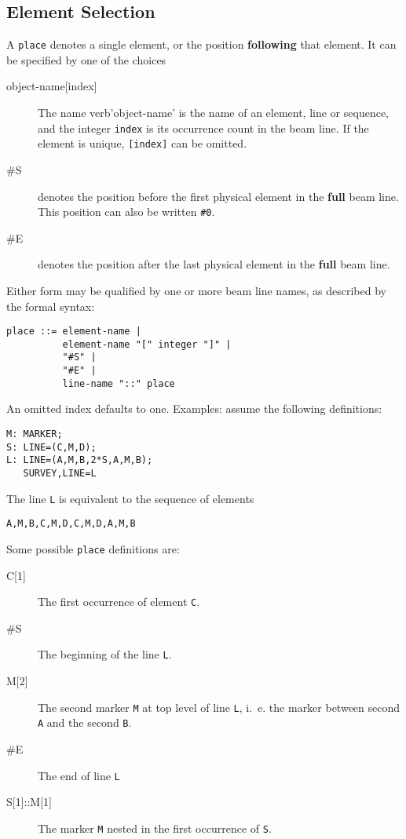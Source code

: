 \subsection{Element Selection}
\label{sec:aplace}
A \texttt{place} denotes a single element, or the position 
\textbf{following} that element.
It can be specified by one of the choices
\begin{description}
\item[{object-name[index]}]
The name verb'object-name' is the name of an element, line or sequence,
and the integer \texttt{index} is its occurrence count in the beam line.
If the element is unique, \texttt{[index]} can be omitted.
\item[{\#S}]
denotes the position before the first physical element in the \textbf{full} 
beam line.
This position can also be written \texttt{\#0}.
\item[{\#E}]
denotes the position after the last physical element in the \textbf{full} 
beam line.
\end{description}
Either form may be qualified by one or more beam line names,
as described by the formal syntax:
\begin{verbatim}
place ::= element-name |
          element-name "[" integer "]" |
          "#S" |
          "#E" |
          line-name "::" place
\end{verbatim}
An omitted index defaults to one.
\noindent Examples: assume the following definitions:
\begin{verbatim}
M: MARKER;
S: LINE=(C,M,D);
L: LINE=(A,M,B,2*S,A,M,B);
   SURVEY,LINE=L
\end{verbatim}
The line \texttt{L} is equivalent to the sequence of elements
\begin{verbatim}
A,M,B,C,M,D,C,M,D,A,M,B
\end{verbatim}
Some possible \texttt{place} definitions are:
\begin{description}
\item[{C[1]}]
The first occurrence of element \texttt{C}.
\item[\#S]
The beginning of the line \texttt{L}.
\item[{M[2]}]
The second marker \texttt{M} at top level of line \texttt{L},
i.~e. the marker between second \texttt{A} and the second \texttt{B}.
\item[\#E]
The end of line \texttt{L}
\item[{S[1]::M[1]}]
The marker \texttt{M} nested in the first occurrence of \texttt{S}.
\end{description}

